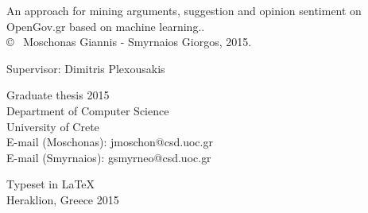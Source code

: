 \newpage
\thispagestyle{plain}
\vspace*{4.5cm}
 An approach for mining arguments, suggestion and opinion sentiment on\\ OpenGov.gr based on machine learning..\\

\copyright ~  Moschonas Giannis - Smyrnaios Giorgos, 2015. \setlength{\parskip}{1cm}

Supervisor: Dimitris Plexousakis%

Graduate thesis 2015\\	%
Department of Computer Science\\
University of Crete\\
E-mail (Moschonas): jmoschon@csd.uoc.gr\\
E-mail (Smyrnaios): gsmyrneo@csd.uoc.gr\setlength{\parskip}{0.5cm}

\vfill

Typeset in \LaTeX \\
Heraklion, Greece 2015

